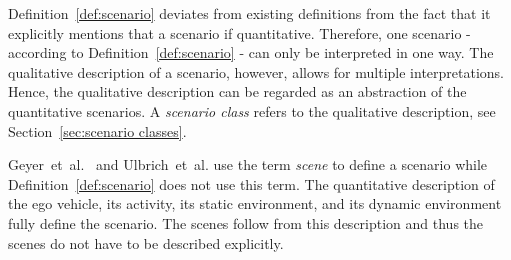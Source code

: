 Definition~\ref{def:scenario} deviates from existing definitions \cite{geyer2014, ulbrich2015, elrofai2016scenario} from the fact that it explicitly mentions that a scenario if quantitative. Therefore, one scenario - according to Definition~\ref{def:scenario} - can only be interpreted in one way. The qualitative description of a scenario, however, allows for multiple interpretations. Hence, the qualitative description can be regarded as an abstraction of the quantitative scenarios. A \emph{scenario class} refers to the qualitative description, see Section~\ref{sec:scenario classes}.

Geyer~et~al.~\cite{geyer2014} and Ulbrich~et~al.\cite{ulbrich2015} use the term \emph{scene} to define a scenario while Definition~\ref{def:scenario} does not use this term. The quantitative description of the ego vehicle, its activity, its static environment, and its dynamic environment fully define the scenario. The scenes follow from this description and thus the scenes do not have to be described explicitly.

